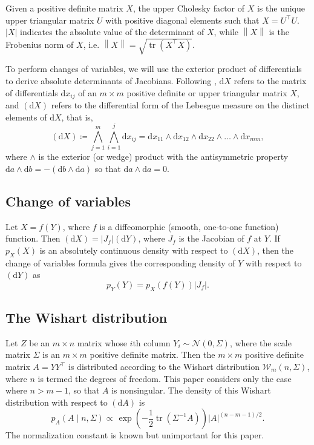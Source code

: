 \documentclass[12pt,a4paper,reqno]{amsart}
\numberwithin{equation}{section}
\newcommand{\wishart}[1]{\mathcal{W}_{#1}}
\renewcommand{\det}[1]{\left| {#1} \right|}
\newcommand{\dmeasure}[1]{\left(\dd{#1}\right)}
\newcommand{\norm}[1]{\left\lVert {#1} \right\rVert}
\newcommand{\dd}[1]{\mathrm{d}{#1}}
\newcommand{\tr}{\operatorname{tr}}
\begin{document}
Given a positive definite matrix $X$, the upper Cholesky factor of $X$ is the unique upper triangular matrix $U$ with positive diagonal elements such that $X = U^\top U$.
$\det{X}$ indicates the absolute value of the determinant of $X$, while $\norm{X}$ is the Frobenius norm of $X$, i.e. $\norm{X} = \sqrt{\tr(X^\top X)}$.

To perform changes of variables, we will use the exterior product of differentials to derive absolute determinants of Jacobians.
Following \cite{muirhead_aspects_1982}, $\dd{X}$ refers to the matrix of differentials $\dd{x}_{ij}$ of an $m \times m$ positive definite or upper triangular matrix $X$, and $\dmeasure{X}$ refers to the differential form of the Lebesgue measure on the distinct elements of $\dd{X}$, that is,
\[
    \dmeasure{X} \coloneqq \bigwedge_{j=1}^m \bigwedge_{i=1}^j \dd{x}_{ij} = \dd{x}_{11} \wedge \dd{x}_{12} \wedge \dd{x}_{22} \wedge \ldots \wedge \dd{x}_{mm},
\]
where $\wedge$ is the exterior (or wedge) product with the antisymmetric property $\dd{a} \wedge \dd{b} = -(\dd{b} \wedge \dd{a})$ so that $\dd{a} \wedge \dd{a} = 0$.

\subsection*{Change of variables}

Let $X = f(Y)$, where $f$ is a diffeomorphic (smooth, one-to-one function) function.
Then $\dmeasure{X} = \det{J_f} \dmeasure{Y}$, where $J_f$ is the Jacobian of $f$ at $Y$.
If $p_X(X)$ is an absolutely continuous density with respect to $\dmeasure{X}$, then the change of variables formula gives the corresponding density of $Y$ with respect to $\dmeasure{Y}$ as
\[
    p_Y(Y) = p_X(f(Y)) \det{J_f}.
\]

\subsection*{The Wishart distribution}

Let $Z$ be an $m \times n$ matrix whose $i$th column $Y_i \sim \mathcal{N}(0, \Sigma)$, where the scale matrix $\Sigma$ is an $m \times m$ positive definite matrix.
Then the $m \times m$ positive definite matrix $A = Y Y^\top$ is distributed according to the Wishart distribution $\wishart{m}(n, \Sigma)$, where $n$ is termed the degrees of freedom.
This paper considers only the case where $n > m-1$, so that $A$ is nonsingular.
The density of this Wishart distribution with respect to $\dmeasure{A}$ is \parencite[Theorem 3.2.1]{muirhead_aspects_1982}
\begin{equation}\label{wishartdensity}
    p_A(A \mid n, \Sigma) \propto \frac{}{} \exp\left(-\frac{1}{2}\tr(\Sigma^{-1} A)\right) \det{A}^{(n-m-1)/2}.
\end{equation}
The normalization constant is known but unimportant for this paper.
\end{document}
